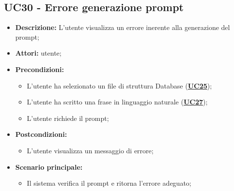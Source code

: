 \subsection{UC30 - Errore generazione prompt}
\label{sec:UC30}
\begin{itemize}
	\item \textbf{Descrizione:} L’utente visualizza un errore inerente alla generazione del prompt;
	\item \textbf{Attori:} utente;
	\item \textbf{Precondizioni:} 
	\begin{itemize}
		\item L’utente ha selezionato un file di struttura Database (\hyperref[sec:UC25]{\textbf{UC25}});
		\item L’utente ha scritto una frase in linguaggio naturale (\hyperref[sec:UC27]{\textbf{UC27}});
		\item L’utente richiede il prompt;
	\end{itemize}
	\item \textbf{Postcondizioni:} 
	\begin{itemize}
		\item L’utente visualizza un messaggio di errore;
	\end{itemize}
	\item \textbf{Scenario principale:} 
	\begin{itemize}
		\item Il sistema verifica il prompt e ritorna l'errore adeguato;
	\end{itemize}
\end{itemize}

